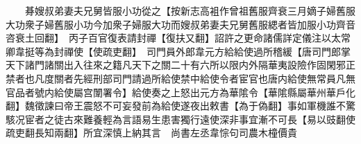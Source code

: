 　　朞嫂叔弟妻夫兄舅皆服小功從之【按新志高袓作曾祖舊服齊衰三月嫡子婦舊服大功衆子婦舊服小功今加衆子婦服大功而嫂叔弟妻夫兄舅舊服緦者皆加服小功齊音咨衰土回翻】　丙子百官復表請封禪【復扶又翻】詔許之更命諸儒詳定儀注以太常卿韋挺等為封禪使【使疏吏翻】　司門員外郎韋元方給給使過所稽緩【唐司門郎掌天下諸門諸關出入往來之籍凡天下之關二十有六所以限内外隔華夷設險作固閑邪正禁者也凡度關者先經刑部司門請過所給使禁中給使令者宦官也唐内給使無常員凡無官品者號内給使屬宫闈署令】給使奏之上怒出元方為華隂令【華隂縣屬華州華戶化翻】魏徵諫曰帝王震怒不可妄發前為給使遂夜出敕書【為于偽翻】事如軍機誰不驚駭况宦者之徒古來難養輕為言語易生患害獨行遠使深非事宜漸不可長【易以豉翻使疏吏翻長知兩翻】所宜深慎上納其言　尚書左丞韋悰句司農木橦價貴